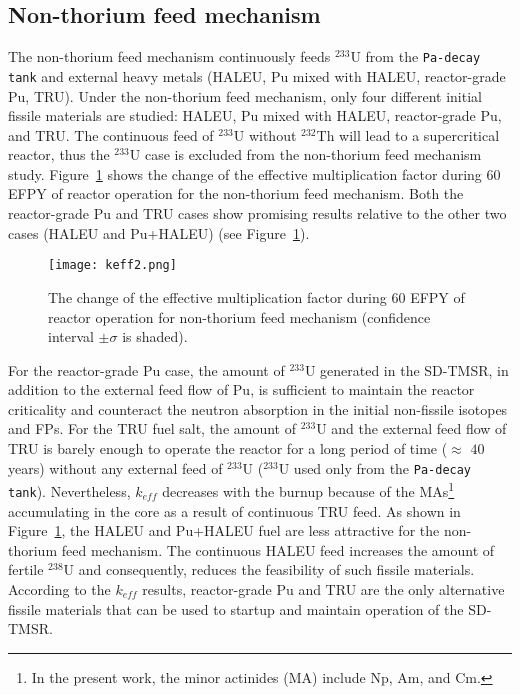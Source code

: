 \subsection{Non-thorium feed mechanism}
The non-thorium feed mechanism continuously feeds 
$^{233}$U from the \texttt{Pa-decay tank} and external heavy metals (\gls{HALEU}, Pu mixed with \gls{HALEU}, reactor-grade Pu, \gls{TRU}).
Under the non-thorium feed mechanism, only four different initial fissile materials are studied: \gls{HALEU}, Pu mixed with \gls{HALEU}, reactor-grade Pu, and \gls{TRU}. The continuous feed of $^{233}$U 
without $^{232}$Th will lead to a supercritical reactor, thus the $^{233}$U case 
is excluded from the non-thorium feed mechanism study.
Figure~\ref{fig:keff2} shows the change of the effective multiplication factor 
during 60 \gls{EFPY} of reactor operation for the non-thorium feed mechanism. Both the reactor-grade Pu and TRU cases 
show promising results relative to the other two cases (HALEU and Pu+HALEU) (see Figure~\ref{fig:keff2}). 
\begin{figure}
	\centering
	\texttt{[image: keff2.png]}
			\vspace{-0.5in}
	\caption{The change of the effective multiplication factor during 60 
	\gls{EFPY} of reactor operation for non-thorium feed mechanism (confidence 
	interval $\pm\sigma$ is shaded).} 
	\label{fig:keff2}
\end{figure}
For the reactor-grade Pu case, the amount of $^{233}$U generated in the SD-TMSR, in addition to the external feed flow of Pu, is sufficient to maintain the reactor criticality and counteract the neutron absorption in the initial non-fissile isotopes and FPs. 
For the \gls{TRU} fuel salt, the amount of 
$^{233}$U and the external feed flow of TRU is barely enough to operate the 
reactor for a long period of time ($\approx$ $40$ years) without any 
external feed of $^{233}$U ($^{233}$U used only from the \texttt{Pa-decay tank}). Nevertheless, $k_{eff}$ decreases with the burnup 
because of the \glspl{MA}\footnote{In the present work, the minor actinides 
(MA) include Np, Am, and Cm.} accumulating in the core as a result of 
continuous TRU feed. As shown in Figure~\ref{fig:keff2}, the HALEU and Pu+HALEU 
fuel are less attractive for the non-thorium feed mechanism. The continuous HALEU 
feed increases the amount of fertile $^{238}$U and consequently, reduces the 
feasibility of such fissile materials. According to the $k_{eff}$ 
results, reactor-grade Pu and TRU are the only alternative fissile materials that  
can be used to startup and maintain operation of the SD-TMSR.

